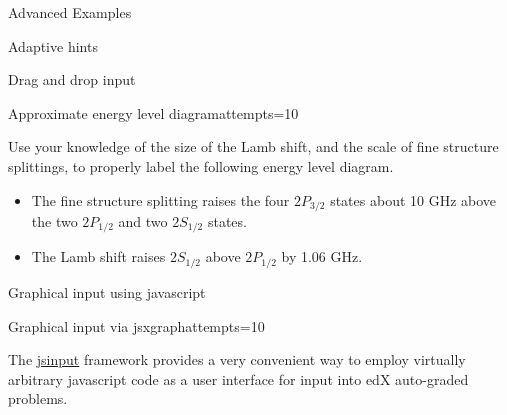 \begin{edXchapter}{Advanced Examples}
\begin{edXsection}{Adaptive hints}
\begin{edXvertical}

\end{edXvertical}

\end{edXsection}


\begin{edXsection}{Drag and drop input}

\begin{edXvertical}

\begin{edXproblem}{Approximate energy level diagram}{attempts=10}

Use your knowledge of the size of the Lamb shift, and the scale of fine
structure splittings, to properly label the following energy level diagram.


\begin{edXsolution}

\begin{itemize}

\item The fine structure splitting raises the four $2P_{3/2}$ states about
10 GHz above the two $2P_{1/2}$ and two $2S_{1/2}$ states.

\item The Lamb shift raises $2S_{1/2}$ above $2P_{1/2}$ by 1.06 GHz.

\end{itemize}

\end{edXsolution}

\end{edXproblem}


\end{edXvertical}

\end{edXsection}


\begin{edXsection}{Graphical input using javascript}

\begin{edXvertical}

\begin{edXproblem}{Graphical input via jsxgraph}{attempts=10}

The \href{http://edx.readthedocs.org/projects/devdata/en/latest/course_data_formats/jsinput.html}{jsinput} framework provides a very convenient way to
employ virtually arbitrary javascript code as a user interface for
input into edX auto-graded problems.  


\end{edXproblem}
\end{edXvertical}
\end{edXsection}
\end{edXchapter}
